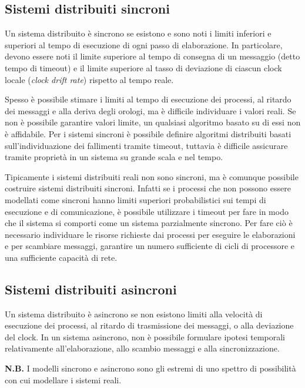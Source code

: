 \subsection{Sistemi distribuiti sincroni}
Un sistema distribuito è sincrono se esistono e sono noti i limiti inferiori e superiori al tempo di esecuzione di ogni passo di elaborazione. In particolare, devono essere noti il limite superiore al tempo di consegna di un messaggio (detto tempo di timeout) e il limite superiore al tasso di deviazione di ciascun clock locale (\textit{clock drift rate}) rispetto al tempo reale.

Spesso è possibile stimare i limiti al tempo di esecuzione dei processi, al ritardo dei messaggi e alla deriva degli orologi, ma è difficile individuare i valori reali. Se non è possibile garantire valori limite, un qualsiasi algoritmo basato su di essi non è affidabile. Per i sistemi sincroni è possibile definire algoritmi distribuiti basati sull'individuazione dei fallimenti tramite timeout, tuttavia è difficile assicurare tramite proprietà in un sistema su grande scala e nel tempo. 

Tipicamente i sistemi distribuiti reali non sono sincroni, ma è comunque possibile costruire sistemi distribuiti sincroni. Infatti se i processi che non possono essere modellati come sincroni hanno limiti superiori probabilistici sui tempi di esecuzione e di comunicazione, è possibile utilizzare i timeout per fare in modo che il sistema si comporti come un sistema parzialmente sincrono. Per fare ciò è necessario individuare le risorse richieste dai processi per eseguire le elaborazioni e per scambiare messaggi, garantire un numero sufficiente di cicli di processore e una sufficiente capacità di rete.

\subsection{Sistemi distribuiti asincroni}
Un sistema distribuito è asincrono se non esistono limiti alla velocità di esecuzione dei processi, al ritardo di trasmissione dei messaggi, o alla deviazione del clock. In un sistema asincrono, non è possibile formulare ipotesi temporali relativamente all'elaborazione, allo scambio messaggi e alla sincronizzazione. 
\begin{mdframed}[backgroundcolor=gray!20,shadow=false]
\textbf{N.B.} I modelli sincrono e asincrono sono gli estremi di uno spettro di possibilità con cui modellare i sistemi reali.
\end{mdframed}

